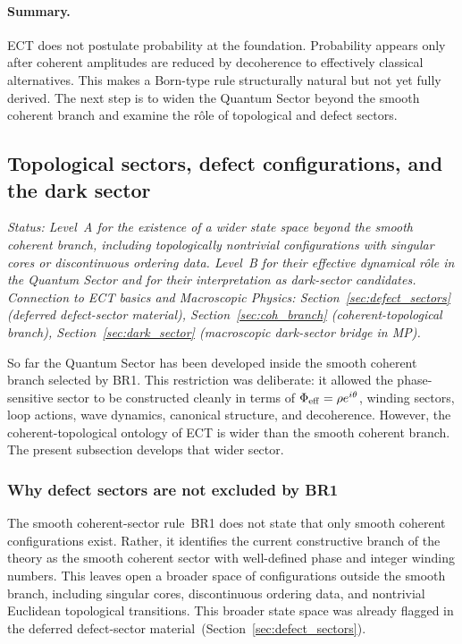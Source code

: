 \documentclass[11pt,a4paper]{article}
\numberwithin{equation}{section}
\begin{document}
\paragraph{Summary.}
ECT does not postulate probability at the foundation.
Probability appears only after coherent amplitudes are reduced by
decoherence to effectively classical alternatives.
This makes a Born-type rule structurally natural but not yet fully
derived.
The next step is to widen the Quantum Sector beyond the smooth
coherent branch and examine the r\^ole of topological and defect
sectors.

\subsection{Topological sectors, defect configurations, and the dark sector}
\label{sec:qs_defects}
\label{sec:qs_dark_sector}

\textit{Status: Level~A for the existence of a wider state space
beyond the smooth coherent branch, including topologically
nontrivial configurations with singular cores or discontinuous
ordering data.
Level~B for their effective dynamical r\^ole in the Quantum Sector
and for their interpretation as dark-sector candidates.
Connection to ECT basics and Macroscopic Physics:
Section~\ref{sec:defect_sectors} (deferred defect-sector material),
Section~\ref{sec:coh_branch} (coherent-topological branch),
Section~\ref{sec:dark_sector} (macroscopic dark-sector bridge in MP).}

\medskip
So far the Quantum Sector has been developed inside the smooth coherent
branch selected by BR1.
This restriction was deliberate: it allowed the phase-sensitive sector
to be constructed cleanly in terms of $\Phi_{\rm eff}=\rho e^{i\theta}$,
winding sectors, loop actions, wave dynamics, canonical structure,
and decoherence.
However, the coherent-topological ontology of ECT is wider than the
smooth coherent branch.
The present subsection develops that wider sector.

\subsubsection*{Why defect sectors are not excluded by BR1}

The smooth coherent-sector rule~BR1 does not state that only smooth
coherent configurations exist. Rather, it identifies the current
constructive branch of the theory as the smooth coherent sector with
well-defined phase and integer winding numbers.
This leaves open a broader space of configurations outside the smooth
branch, including singular cores, discontinuous ordering data, and
nontrivial Euclidean topological transitions.
This broader state space was already flagged in the deferred
defect-sector material~(Section~\ref{sec:defect_sectors}).
\end{document}
